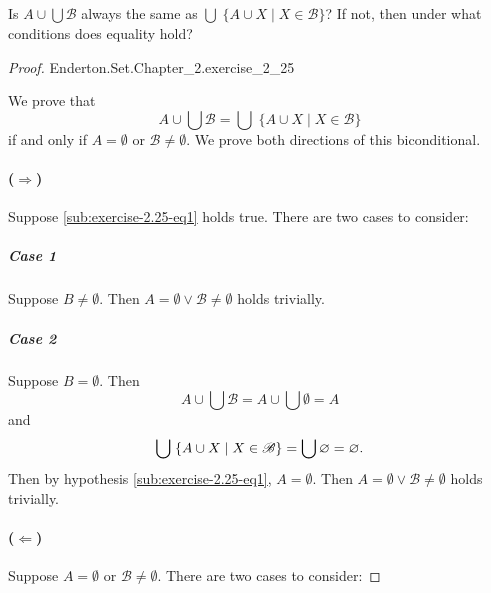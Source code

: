 \documentclass{report}
\begin{document}
\subsection{}%
\label{sub:exercise-2.25}

Is $A \cup \bigcup \mathscr{B}$ always the same as
  $\bigcup\;\{ A \cup X \mid X \in \mathscr{B} \}$?
If not, then under what conditions does equality hold?

\begin{proof}

    {Enderton.Set.Chapter\_2.exercise\_2\_25}

  We prove that
    \begin{equation}
      \label{sub:exercise-2.25-eq1}
      A \cup \bigcup \mathscr{B} =
        \bigcup\;\{ A \cup X \mid X \in \mathscr{B} \}
    \end{equation}
    if and only if $A = \emptyset$ or $\mathscr{B} \neq \emptyset$.
  We prove both directions of this biconditional.

  \paragraph{($\Rightarrow$)}%

    Suppose \eqref{sub:exercise-2.25-eq1} holds true.
    There are two cases to consider:

    \subparagraph{Case 1}%

      Suppose $B \neq \emptyset$.
      Then $A = \emptyset \lor \mathscr{B} \neq \emptyset$ holds trivially.

    \subparagraph{Case 2}%

      Suppose $B = \emptyset$.
      Then $$A \cup \bigcup \mathscr{B} = A \cup \bigcup \emptyset = A$$ and
        $$
          \bigcup\;\{ A \cup X \mid X \in \mathscr{B} \}
            = \bigcup \emptyset \\
            = \emptyset.
        $$
      Then by hypothesis \eqref{sub:exercise-2.25-eq1}, $A = \emptyset$.
      Then $A = \emptyset \lor \mathscr{B} \neq \emptyset$ holds trivially.

  \paragraph{($\Leftarrow$)}%

    Suppose $A = \emptyset$ or $\mathscr{B} \neq \emptyset$.
    There are two cases to consider:


\end{proof}
\end{document}
